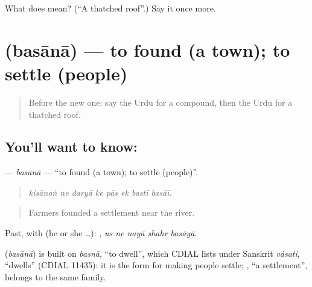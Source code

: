 \begin{tcolorbox}[breakable,colback=teal!4,colframe=teal!35!black,title={Before you move on}]
What does  mean? (\textquotedblleft{}A thatched roof\textquotedblright{}.) Say it once more.
\end{tcolorbox}
\section[\texorpdfstring{\ur{بسانا} (basānā)}{بسانا (basānā)}]{ (basānā) — to found (a town); to settle (people)}

\label{lesson:UR-C413-basana}



\begin{quote}
Before the new one: say the Urdu for a compound, then the Urdu for a thatched roof.
\end{quote}

\subsection*{You'll want to know: }
\textbf{} — \emph{basānā} — \textquotedblleft{}to found (a town); to settle (people)\textquotedblright{}.

\begin{quote}
       
\end{quote}

\begin{quote}
\emph{kisānoṅ ne daryā ke pās ek bastī basāī.}
\end{quote}

\begin{quote}
Farmers founded a settlement near the river.
\end{quote}

Past, with  (he or she …):     , \emph{us ne nayā shahr basāyā}.

\begin{cousinweb}
\textbf{} (\emph{basānā}) is built on \emph{basnā}, \textquotedblleft{}to dwell\textquotedblright{}, which CDIAL lists under Sanskrit \emph{vásati}, \textquotedblleft{}dwells\textquotedblright{} (CDIAL 11435): it is the form for making people settle; \textbf{}, \textquotedblleft{}a settlement\textquotedblright{}, belongs to the same family.
\end{cousinweb}

